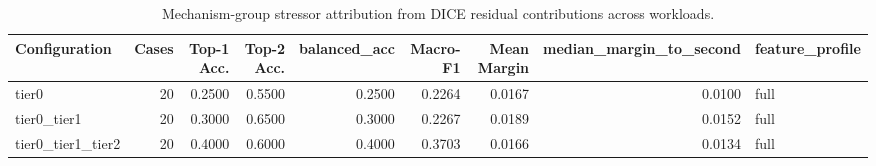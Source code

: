 \begin{table}[t]
\centering
\caption{Mechanism-group stressor attribution from DICE residual contributions across workloads.}
\label{tab:dice_stressor_diagnosis}
\footnotesize
\begin{tabular}{lrrrrrrrl}
\toprule
Configuration & Cases & Top-1 Acc. & Top-2 Acc. & balanced_acc & Macro-F1 & Mean Margin & median_margin_to_second & feature_profile \\
\midrule
tier0 & 20 & 0.2500 & 0.5500 & 0.2500 & 0.2264 & 0.0167 & 0.0100 & full \\
tier0_tier1 & 20 & 0.3000 & 0.6500 & 0.3000 & 0.2267 & 0.0189 & 0.0152 & full \\
tier0_tier1_tier2 & 20 & 0.4000 & 0.6000 & 0.4000 & 0.3703 & 0.0166 & 0.0134 & full \\
\bottomrule
\end{tabular}

\end{table}
